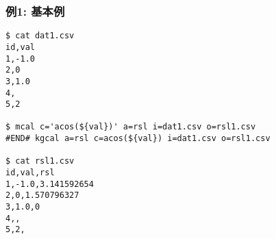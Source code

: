 
\subsubsection*{例1: 基本例}


\begin{Verbatim}[baselinestretch=0.7,frame=single]
$ cat dat1.csv
id,val
1,-1.0
2,0
3,1.0
4,
5,2

$ mcal c='acos(${val})' a=rsl i=dat1.csv o=rsl1.csv
#END# kgcal a=rsl c=acos(${val}) i=dat1.csv o=rsl1.csv

$ cat rsl1.csv
id,val,rsl
1,-1.0,3.141592654
2,0,1.570796327
3,1.0,0
4,,
5,2,
\end{Verbatim}
